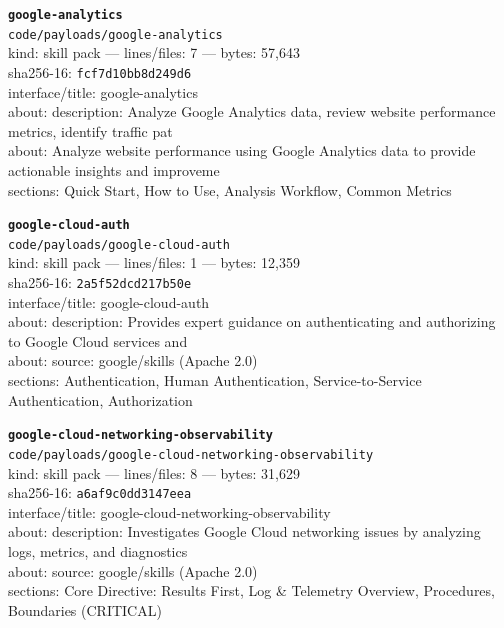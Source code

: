 \noindent\textbf{\texttt{google-analytics}}\\
\texttt{code/payloads/google-analytics}\\
kind: skill pack --- lines/files: 7 --- bytes: 57,643\\
sha256-16: \texttt{fcf7d10bb8d249d6}\\
interface/title: google-analytics\\
about: description: Analyze Google Analytics data, review website performance metrics, identify traffic pat\\
about: Analyze website performance using Google Analytics data to provide actionable insights and improveme\\
sections: Quick Start, How to Use, Analysis Workflow, Common Metrics\\
\vspace*{6.0pt}

\noindent\textbf{\texttt{google-cloud-auth}}\\
\texttt{code/payloads/google-cloud-auth}\\
kind: skill pack --- lines/files: 1 --- bytes: 12,359\\
sha256-16: \texttt{2a5f52dcd217b50e}\\
interface/title: google-cloud-auth\\
about: description: Provides expert guidance on authenticating and authorizing to Google Cloud services and\\
about: source: google/skills (Apache 2.0)\\
sections: Authentication, Human Authentication, Service-to-Service Authentication, Authorization\\
\vspace*{6.0pt}

\noindent\textbf{\texttt{google-cloud-networking-observability}}\\
\texttt{code/payloads/google-cloud-networking-observability}\\
kind: skill pack --- lines/files: 8 --- bytes: 31,629\\
sha256-16: \texttt{a6af9c0dd3147eea}\\
interface/title: google-cloud-networking-observability\\
about: description: Investigates Google Cloud networking issues by analyzing logs, metrics, and diagnostics\\
about: source: google/skills (Apache 2.0)\\
sections: Core Directive: Results First, Log \& Telemetry Overview, Procedures, Boundaries (CRITICAL)\\
\vspace*{6.0pt}

